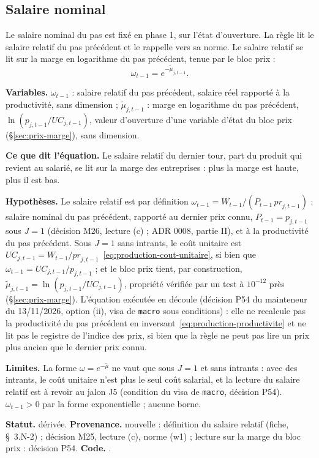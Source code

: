 \documentclass[11pt,a4paper]{article}
\newcommand{\variables}{\par\noindent\textbf{Variables.} }
\newcommand{\sens}{\par\noindent\textbf{Ce que dit l'équation.} }
\newcommand{\hyp}{\par\noindent\textbf{Hypothèses.} }
\newcommand{\limites}{\par\noindent\textbf{Limites.} }
\newcommand{\code}[1]{\texttt{\detokenize{#1}}}
\newcommand{\tracabilite}[3]{\par\smallskip\noindent\textbf{Statut.} #1. \textbf{Provenance.} #2. \textbf{Code.} \code{#3}.}
\begin{document}
\subsection{Salaire nominal}
\label{sec:travail-salaire}
Le salaire nominal du pas est fixé en phase 1, sur l'état d'ouverture. La règle lit le salaire relatif du pas précédent et le rappelle vers sa norme. Le salaire relatif se lit sur la marge en logarithme du pas précédent, tenue par le bloc prix :
\begin{equation}\label{eq:travail-salaire-relatif}
\omega_{t-1} = e^{-\tilde\mu_{j,t-1}} .
\end{equation}
\begin{lecture}
\variables $\omega_{t-1}$ : salaire relatif du pas précédent, salaire réel rapporté à la productivité, sans dimension ; $\tilde\mu_{j,t-1}$ : marge en logarithme du pas précédent, $\ln(p_{j,t-1}/\mathit{UC}_{j,t-1})$, valeur d'ouverture d'une variable d'état du bloc prix (\S\ref{sec:prix-marge}), sans dimension.
\sens Le salaire relatif du dernier tour, part du produit qui revient au salarié, se lit sur la marge des entreprises : plus la marge est haute, plus il est bas.
\hyp Le salaire relatif est par définition $\omega_{t-1} = W_{t-1}/(P_{t-1}\,\mathit{pr}_{j,t-1})$ : salaire nominal du pas précédent, rapporté au dernier prix connu, $P_{t-1} = p_{j,t-1}$ sous $J = 1$ (décision M26, lecture (c) ; ADR 0008, partie II), et à la productivité du pas précédent. Sous $J = 1$ sans intrants, le coût unitaire est $\mathit{UC}_{j,t-1} = W_{t-1}/\mathit{pr}_{j,t-1}$~\eqref{eq:production-cout-unitaire}, si bien que $\omega_{t-1} = \mathit{UC}_{j,t-1}/p_{j,t-1}$ ; et le bloc prix tient, par construction, $\tilde\mu_{j,t-1} = \ln(p_{j,t-1}/\mathit{UC}_{j,t-1})$, propriété vérifiée par un test à $10^{-12}$ près (\S\ref{sec:prix-marge}). L'équation exécutée en découle (décision P54 du mainteneur du 13/11/2026, option (ii), visa de \texttt{macro} sous conditions) : elle ne recalcule pas la productivité du pas précédent en inversant~\eqref{eq:production-productivite} et ne lit pas le registre de l'indice des prix, si bien que la règle ne peut pas lire un prix plus ancien que le dernier prix connu.
\limites La forme $\omega = e^{-\tilde\mu}$ ne vaut que sous $J = 1$ et sans intrants : avec des intrants, le coût unitaire n'est plus le seul coût salarial, et la lecture du salaire relatif est à revoir au jalon J5 (condition du visa de \texttt{macro}, décision P54). $\omega_{t-1} > 0$ par la forme exponentielle ; aucune borne.
\tracabilite{dérivée}{nouvelle : définition du salaire relatif (fiche, \S~3.N-2) ; décision M25, lecture (c), norme (w1) ; lecture sur la marge du bloc prix : décision P54}{nations.blocs.travail.salaire_relatif}
\end{lecture}
\end{document}
